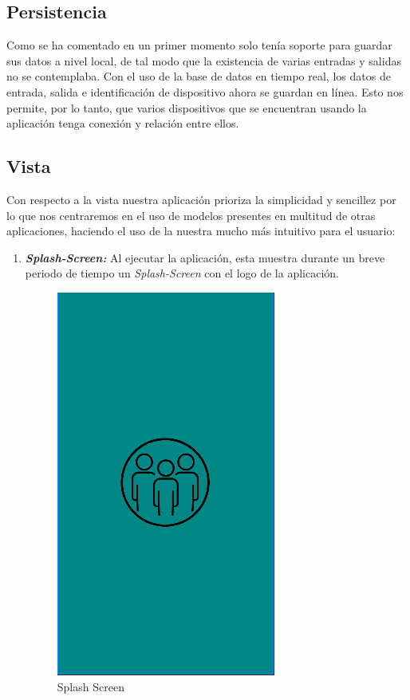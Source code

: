 \documentclass[a4paper,openright,12pt]{article}
\begin{document}
\begin{itemize}
\subsection{Persistencia}
Como se ha comentado en un primer momento solo tenía soporte para guardar sus datos a nivel local, de tal modo que la existencia de varias entradas y salidas no se contemplaba. Con el uso de la base de datos en tiempo real, los datos de entrada, salida e identificación de dispositivo ahora se guardan en línea. Esto nos permite, por lo tanto, que varios dispositivos que se encuentran usando la aplicación tenga conexión y relación entre ellos.
\subsection{Vista}
Con respecto a la vista nuestra aplicación prioriza la simplicidad y sencillez por lo que nos centraremos en el uso de modelos presentes en multitud de otras aplicaciones, haciendo el uso de la nuestra mucho más intuitivo para el usuario:


\begin{enumerate}
\item\textbf{\textit{Splash-Screen:}} Al ejecutar la aplicación, esta muestra durante un breve periodo de tiempo un \textit{Splash-Screen} con el logo de la aplicación.
\begin{figure}[H]
     \centering
    \includegraphics[scale=0.7]{splashscreen.PNG}
     \caption{Splash Screen}
    \label{fig:my_label}
\end{figure}


\end{enumerate}
\end{itemize}
\end{document}
